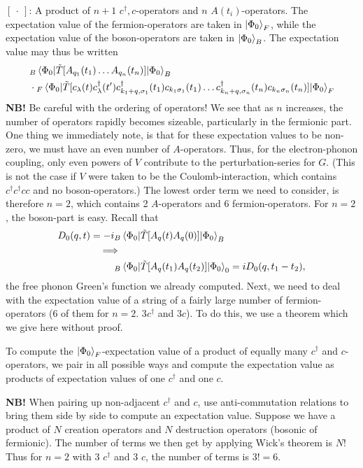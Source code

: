 $[\ \cdot\ ]$: A product of $n+1$ $ c^\dagger, c $-operators and $n$ $A(t_i)$-operators. The expectation value of the fermion-operators are taken in $\ket{\Phi_0}_F$, while the expectation value of the boson-operators are taken in $\ket{\Phi_0}_B$. The expectation value may thus be written
\begin{align*} 
&{}_B\ev{\tilde{T}[A_{q_1}(t_1)\dots A_{q_n}(t_n)]}{\Phi_0}_B\\
& \cdot {}_F\ev{\tilde{T}[c_\lambda(t)c_\lambda^\dagger(t') c_{k_1+q, \sigma_1}^\dagger(t_1) c_{k_1\sigma_1}(t_1)\dots c_{k_n+q, \sigma_n}^\dagger(t_n) c_{k_n\sigma_n}(t_n)]}{\Phi_0}_F
\end{align*}
\textbf{NB!} Be careful with the ordering of operators! We see that as $n$ increases, the number of operators rapidly becomes sizeable, particularly in the fermionic part. One thing we immediately note, is that for these expectation values to be non-zero, we must have an even number of $A$-operators. Thus, for the electron-phonon coupling, only even powers of $ V $ contribute to the perturbation-series for $G$. (This is not the case if $V$ were taken to be the Coulomb-interaction, which contains $c^\dagger c^\dagger c c$ and no boson-operators.)
The lowest order term we need to consider, is therefore $n=2$, which contains 2 $A$-operators and 6 fermion-operators. For $n=2$, the boson-part is easy. Recall that 
\begin{align*} 
D_0(q, t) = -i {}_B&\ev{\tilde{T}[A_q(t)A_q(0)]}{\Phi_0}_B \\
\implies& \\
{}_B&\ev{\tilde{T}[A_q(t_1)A_q(t_2)]}{\Phi_0}_0 = iD_0(q, t_1-t_2),
\end{align*}
the free phonon Green's function we already computed. 
Next, we need to deal with the expectation value of a string of a fairly large number of fermion-operators (6 of them for $n=2$. 3$c^\dagger $ and $3 c$).
To do this, we use a theorem which we give here without proof. 
\begin{tcolorbox}[title= Wicks theorem]

To compute the $\ket{\Phi_0}_F$-expectation value of a product of equally many $c^\dagger$ and $c$-operators, we pair in all possible ways and compute the expectation value as products of expectation values of one $c^\dagger$ and one $c$. 
\end{tcolorbox}
\textbf{NB!} When pairing up non-adjacent $c^\dagger $ and $c$, use anti-commutation relations to bring them side by side to compute an expectation value.
Suppose we have a product of $N$ creation operators and $N$ destruction operators (bosonic of fermionic). The number of terms we then get by applying Wick's theorem is $N!$ Thus for $n=2$ with 3 $c^\dagger$ and 3 $c$, the number of terms is $3! =6$. 
